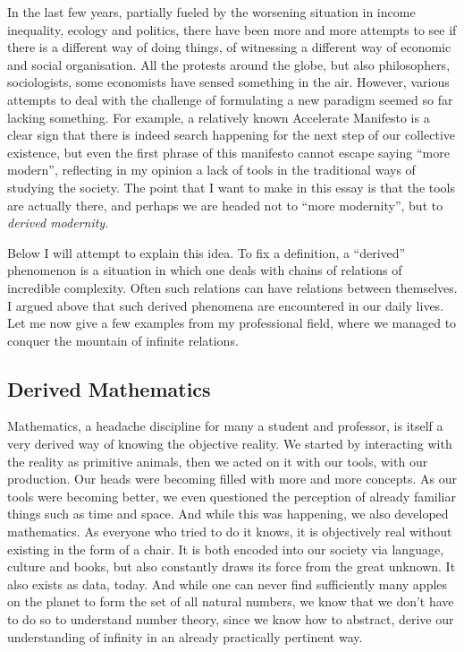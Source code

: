 \documentclass{article}
\begin{document}
In the last few years, partially fueled by the worsening situation in income inequality, ecology and politics,
there have been more and more attempts to see if there is a different way of doing things, of witnessing a different
way of economic and social organisation.
All the protests around the globe, but also philosophers, sociologists, some economists have sensed something in the air.
However, various attempts to deal with the challenge of formulating a new paradigm seemed so far lacking something.
For example, a relatively known Accelerate Manifesto \cite{SRNICEK} is a clear sign that there is indeed search happening for the next step of our collective existence, but even the first phrase of this manifesto cannot escape saying “more modern”, reflecting in my opinion a lack of tools in the traditional ways of studying the society. The point that I want to make in this essay is that the tools are actually there, and perhaps we are headed not to ``more modernity'', but to \emph{derived modernity}.

Below I will attempt to explain this idea. To fix a definition, a “derived” phenomenon is a situation in which one deals with chains of relations of incredible complexity. Often such
relations can have relations between themselves. I argued above that such derived phenomena
are encountered in our daily lives. Let me now give a few examples from my
professional field, where we managed to conquer the mountain of infinite relations.

\subsection*{Derived Mathematics}

Mathematics, a headache discipline for many a student and professor, is itself a very derived way of knowing the objective reality. We started by interacting with the reality as primitive animals, then we acted on it with our tools, with our production. Our heads were becoming filled with more and more concepts. As our tools were becoming better, we even questioned the perception of already familiar things such as time and space. And while this was happening, we also developed mathematics. As everyone who tried to do it knows, it is objectively real without existing in the form of a chair. It is both encoded into our society via language, culture and books, but also constantly draws its force from the great unknown. It also exists as data, today. And while one can never find sufficiently many apples on the planet to form the set of all natural numbers, we know that we don’t have to do so to understand number theory, since we know how to abstract, derive our understanding of infinity in an already practically pertinent way.
\end{document}
